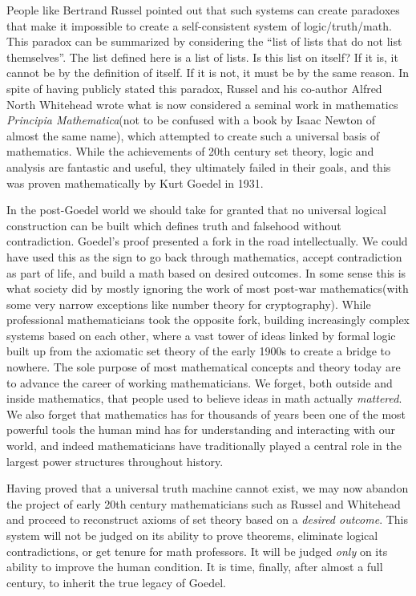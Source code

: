 People like Bertrand Russel pointed out that such systems can create
paradoxes that make it impossible to create a self-consistent system of
logic/truth/math. This paradox can be summarized by considering the
``list of lists that do not list themselves''. The list defined here is
a list of lists. Is this list on itself? If it is, it cannot be by the
definition of itself. If it is not, it must be by the same reason. In
spite of having publicly stated this paradox, Russel and his co-author
Alfred North Whitehead wrote what is now considered a seminal work in
mathematics \emph{Principia Mathematica}(not to be confused with a book
by Isaac Newton of almost the same name), which attempted to create such
a universal basis of mathematics. While the achievements of 20th century
set theory, logic and analysis are fantastic and useful, they ultimately
failed in their goals, and this was proven mathematically by Kurt Goedel
in 1931.

In the post-Goedel world we should take for granted that no universal
logical construction can be built which defines truth and falsehood
without contradiction. Goedel's proof presented a fork in the road
intellectually. We could have used this as the sign to go back through
mathematics, accept contradiction as part of life, and build a math
based on desired outcomes. In some sense this is what society did by
mostly ignoring the work of most post-war mathematics(with some very
narrow exceptions like number theory for cryptography). While
professional mathematicians took the opposite fork, building
increasingly complex systems based on each other, where a vast tower of
ideas linked by formal logic built up from the axiomatic set theory of
the early 1900s to create a bridge to nowhere. The sole purpose of most
mathematical concepts and theory today are to advance the career of
working mathematicians. We forget, both outside and inside mathematics,
that people used to believe ideas in math actually \emph{mattered}. We
also forget that mathematics has for thousands of years been one of the
most powerful tools the human mind has for understanding and interacting
with our world, and indeed mathematicians have traditionally played a
central role in the largest power structures throughout history.

Having proved that a universal truth machine cannot exist, we may now
abandon the project of early 20th century mathematicians such as Russel
and Whitehead and proceed to reconstruct axioms of set theory based on a
\emph{desired outcome}. This system will not be judged on its ability to
prove theorems, eliminate logical contradictions, or get tenure for math
professors. It will be judged \emph{only} on its ability to improve the
human condition. It is time, finally, after almost a full century, to
inherit the true legacy of Goedel.

